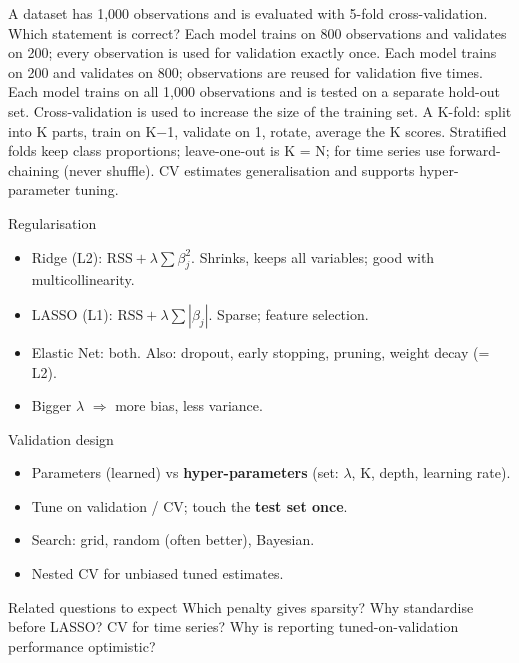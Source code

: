 {A dataset has 1{,}000 observations and is evaluated with 5-fold cross-validation. Which statement is correct?}
{Each model trains on 800 observations and validates on 200; every observation is used for validation exactly once.}
{Each model trains on 200 and validates on 800; observations are reused for validation five times.}
{Each model trains on all 1{,}000 observations and is tested on a separate hold-out set.}
{Cross-validation is used to increase the size of the training set.}
{A}
{K-fold: split into K parts, train on K$-$1, validate on 1, rotate, average the K scores. Stratified folds keep class proportions; leave-one-out is K = N; for time series use forward-chaining (never shuffle). CV estimates generalisation and supports hyper-parameter tuning.}

{\begin{block}{Regularisation}
		\begin{itemize}
			\item Ridge (L2): $\text{RSS}+\lambda\sum\beta_j^2$. Shrinks, keeps all variables; good with multicollinearity.
			\item LASSO (L1): $\text{RSS}+\lambda\sum|\beta_j|$. Sparse; feature selection.
			\item Elastic Net: both. Also: dropout, early stopping, pruning, weight decay (= L2).
			\item Bigger $\lambda$ $\Rightarrow$ more bias, less variance.
\end{itemize}\end{block}}
{\begin{block}{Validation design}
		\begin{itemize}
			\item Parameters (learned) vs \textbf{hyper-parameters} (set: $\lambda$, K, depth, learning rate).
			\item Tune on validation / CV; touch the \textbf{test set once}.
			\item Search: grid, random (often better), Bayesian.
			\item Nested CV for unbiased tuned estimates.
	\end{itemize}\end{block}
	\begin{alertblock}{Related questions to expect}
		Which penalty gives sparsity? Why standardise before LASSO? CV for time series? Why is reporting tuned-on-validation performance optimistic?
\end{alertblock}}

